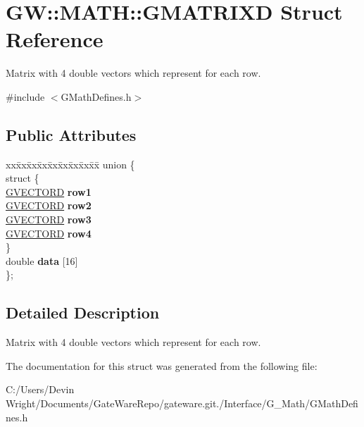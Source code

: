 \hypertarget{struct_g_w_1_1_m_a_t_h_1_1_g_m_a_t_r_i_x_d}{}\section{GW\+:\+:M\+A\+TH\+:\+:G\+M\+A\+T\+R\+I\+XD Struct Reference}
\label{struct_g_w_1_1_m_a_t_h_1_1_g_m_a_t_r_i_x_d}


Matrix with 4 double vectors which represent for each row.  




{\ttfamily \#include $<$G\+Math\+Defines.\+h$>$}

\subsection*{Public Attributes}
\begin{DoxyCompactItemize}
\item 
\mbox{\label{struct_g_w_1_1_m_a_t_h_1_1_g_m_a_t_r_i_x_d_a9b5b90e7bfb77a4cbc91737aaf08b81e}} 
\begin{tabbing}
xx\=xx\=xx\=xx\=xx\=xx\=xx\=xx\=xx\=\kill
union \{\\
\mbox{\label{union_g_w_1_1_m_a_t_h_1_1_g_m_a_t_r_i_x_d_1_1_0D16_a8199bab908e28498a331c5a7962f8b80}} 
\>struct \{\\
\>\>\mbox{\hyperlink{struct_g_w_1_1_m_a_t_h_1_1_g_v_e_c_t_o_r_d}{GVECTORD}} {\bfseries row1}\\
\>\>\mbox{\hyperlink{struct_g_w_1_1_m_a_t_h_1_1_g_v_e_c_t_o_r_d}{GVECTORD}} {\bfseries row2}\\
\>\>\mbox{\hyperlink{struct_g_w_1_1_m_a_t_h_1_1_g_v_e_c_t_o_r_d}{GVECTORD}} {\bfseries row3}\\
\>\>\mbox{\hyperlink{struct_g_w_1_1_m_a_t_h_1_1_g_v_e_c_t_o_r_d}{GVECTORD}} {\bfseries row4}\\
\>\} \\
\>double {\bfseries data} \mbox{[}16\mbox{]}\\
\}; \\

\end{tabbing}\end{DoxyCompactItemize}


\subsection{Detailed Description}
Matrix with 4 double vectors which represent for each row. 

The documentation for this struct was generated from the following file\+:\begin{DoxyCompactItemize}
\item 
C\+:/\+Users/\+Devin Wright/\+Documents/\+Gate\+Ware\+Repo/gateware.\+git./\+Interface/\+G\+\_\+\+Math/G\+Math\+Defines.\+h\end{DoxyCompactItemize}
